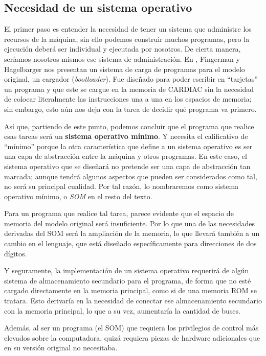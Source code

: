 \documentclass[letterpaper,12pt,oneside]{book}
\begin{document}
	
	
		\subsection{Necesidad de un sistema operativo}
		
		El primer paso es entender la necesidad de tener un sistema que administre los recursos de la máquina, sin ello podemos construir muchos programas, pero
		la ejecución deberá ser individual y ejecutada por nosotros. De cierta manera, seríamos nosotros mismos ese sistema de administración. En 
		\cite[p. 42]{fingerman_instruction_1968}, Fingerman y Hagelbarger
		nos presentan un sistema de carga de programas para el modelo original, un cargador (\textit{bootloader}). Fue diseñado para poder escribir en 
		``tarjetas'' un programa y que este se cargue en
		la memoria de CARDIAC sin la necesidad de colocar literalmente las instrucciones una a una en los espacios de memoria; sin embargo, esto 
		aún nos deja
		con la tarea de decidir qué programa va primero.
  
        Así que, partiendo de este punto, podemos concluir que el programa que realice esas tareas será un \textbf{sistema
		operativo mínimo}. Y necesita el calificativo de ``mínimo'' porque la otra característica que define
		a un sistema operativo es ser una capa de abstracción entre la máquina y otros programas. En este
		caso, el sistema operativo que se diseñará no pretende ser una capa de abstracción tan marcada; aunque tendrá algunos aspectos que pueden ser considerados como tal, no será su principal cualidad. Por tal razón, lo nombraremos como sistema operativo mínimo, o \textit{SOM} en el resto del texto.
		
		Para un programa que realice tal tarea, parece evidente que el espacio de memoria del modelo original será insuficiente. Por lo que una de las necesidades
		derivadas del SOM será la ampliación de la memoria, lo que llevará también a un cambio en el lenguaje, que está diseñado específicamente para direcciones de dos 
		dígitos.
  
        Y seguramente, la implementación de un sistema operativo requerirá de algún sistema de almacenamiento secundario para el programa, de forma que 
        no esté
		cargado directamente en la memoria principal, como si de una memoria ROM se tratara. Esto derivaría en la necesidad de conectar ese almacenamiento secundario
		con la memoria principal, lo que a su vez, aumentaría la cantidad de buses.
  
        Además, al ser un programa (el SOM) que requiera los privilegios de control más elevados sobre la computadora,
		quizá requiera piezas de hardware adicionales que en su versión original no necesitaba.
		
\end{document}
